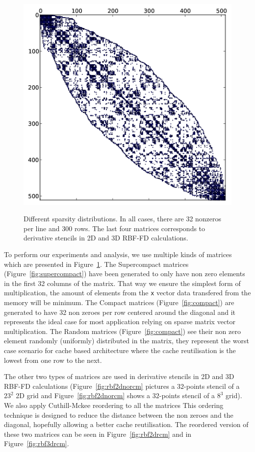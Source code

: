 \documentclass[10pt,conference,compsocconf]{IEEEtran}
\begin{document}
\begin{figure}
\begin{center}
{      \includegraphics[width=\ww]{figures/kd-tree-3d-rcm-crop.png}}%
  \end{center}
  
  \caption{Different sparsity distributions. In all cases, there are
    32 nonzeros per line and 300 rows. The last four matrices
    corresponds to derivative stencils in 2D and 3D RBF-FD
    calculations.}
  \label{fig:spy_plots}
\end{figure}

To perform our experiments and analysis, we use multiple kinds of
matrices which are presented in Figure~\ref{fig:spy_plots}. The
Supercompact matrices (Figure~\ref{fig:supercompact}) have been
generated to only have non zero elements in the first 32 columns of
the matrix. That way we ensure the simplest form of multiplication,
the amount of elements from the {\tt x} vector data transfered from
the memory will be minimum. The Compact matrices
(Figure~\ref{fig:compact}) are generated to have 32 non zeroes per row
centered around the diagonal and it represents the ideal case for most
application relying on sparse matrix vector multiplication. The Random
matrices (Figure~\ref{fig:compact}) see their non zero element
randomly (uniformly) distributed in the matrix, they represent the
worst case scenario for cache based architecture where the cache
reutilisation is the lowest from one row to the next.

The other two types of matrices are used in derivative stencils in 2D
and 3D RBF-FD calculations (Figure~\ref{fig:rbf2dnorcm} pictures a
$32$-points stencil of a $23^2$ 2D grid and
Figure~\ref{fig:rbf2dnorcm} shows a $32$-points stencil of a $8^3$
grid). We also apply Cuthill-Mckee reordering to all the matrices This
ordering technique is designed to reduce the distance between the non
zeroes and the diagonal, hopefully allowing a better cache
reutilisation. The reordered version of these two matrices can be seen
in Figure~\ref{fig:rbf2drcm} and in Figure~\ref{fig:rbf3drcm}.
\end{document}
